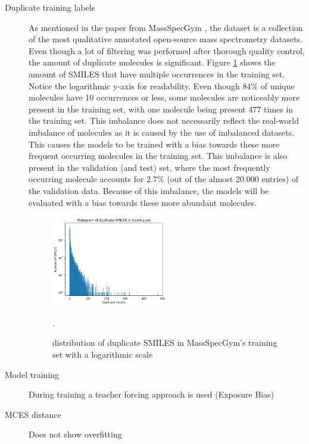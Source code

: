 \begin{description}
    \item[Duplicate training labels]
            As mentioned in the paper from MassSpecGym \cite{bushuiev2024massspecgym}, the dataset is a collection of the most qualitative annotated open-source mass spectrometry datasets.
            Even though a lot of filtering was performed after thorough quality control, the amount of duplicate molecules is significant.
            Figure \ref{fig:duplicate_smiles} shows the amount of SMILES that have multiple occurrences in the training set. Notice the logarithmic y-axis for readability.
            Even though $84\%$ of unique molecules have 10 occurrences or less, some molecules are noticeably more present in the training set, with one molecule being present 477 times in the training set.
            This imbalance does not necessarily reflect the real-world imbalance of molecules as it is caused by the use of imbalanced datasets.
            This causes the models to be trained with a bias towards these more frequent occurring molecules in the training set.
            This imbalance is also present in the validation (and test) set, where the most frequently occurring molecule accounts for $2.7\%$ (out of the almost 20.000 entries) of the validation data.
            Because of this imbalance, the models will be evaluated with a bias towards these more abundant molecules.
    \begin{figure}[h]
        \centering
        \includegraphics[width=0.5\textwidth]{figures/discussion/duplicate_smiles_training_set.png}
        \caption{distribution of duplicate SMILES in MassSpecGym's training set with a logarithmic scale}.
        \label{fig:duplicate_smiles}
    \end{figure}

    \item[Model training] During training a teacher forcing approach is used (Exposure Bias)
    \item[MCES distance] Does not show overfitting 
\end{description}






